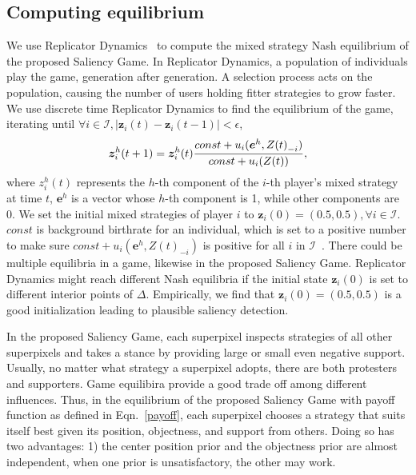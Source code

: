 \documentclass[journal]{IEEEtran}
\begin{document}
\subsection{Computing equilibrium}
We use Replicator Dynamics~\cite{Taylor1978Evolutionarily} to compute the mixed strategy Nash equilibrium of the proposed Saliency Game. In Replicator Dynamics, a population of individuals play the game, generation after generation. A selection process acts on the population, causing the number of users holding fitter strategies to grow faster. We use discrete time Replicator Dynamics to find the equilibrium of the game, iterating until $\forall i \in \mathcal{I}, \left |\boldsymbol{z}_i(t) - \boldsymbol{z}_i(t-1)\right| < \epsilon$,
\begin{equation}
\setlength{\abovedisplayskip}{2pt}
\setlength{\belowdisplayskip}{2pt}
\boldsymbol{z}_{i}^h(t+1) = \boldsymbol{z}_{i}^h(t) \frac{const + u_i(\boldsymbol{e}^h, {Z(t)}_{-i})}{const + u_i(Z(t))}, 
\end{equation}
where $z_{i}^h(t)$ represents the $h$-th component of the $i$-th player's mixed strategy at time $t$, $\boldsymbol{e}^h$ is a vector whose $h$-th component is 1, while other components are 0. We set the initial mixed strategies of player $i$ to $\boldsymbol{z}_i(0) = (0.5, 0.5), \forall i \in \mathcal{I}$. $const$ is background birthrate for an individual, which is set to a positive number to make sure $const + u_i(\boldsymbol{e}^h, {Z(t)}_{-i})$ is positive for all $i$ in $\mathcal{I}$~\cite{Weibull1999Eolutionary}. There could be multiple equilibria in a game, likewise in the proposed Saliency Game. Replicator Dynamics might reach different Nash equilibria if the initial state $\boldsymbol{z}_i(0)$ is set to different interior points of $\Delta$. Empirically, we find that $\boldsymbol{z}_i(0)=(0.5, 0.5)$ is a good initialization leading to plausible saliency detection. %

In the proposed Saliency Game, each superpixel inspects strategies of all other superpixels and takes a stance by providing large or small even negative support. Usually, no matter what strategy a superpixel adopts, there are both protesters and supporters. Game equilibira provide a good trade off among different influences. Thus, in the equilibrium of the proposed Saliency Game with payoff function as defined in Eqn.~\ref{payoff}, each superpixel chooses a strategy that suits itself best given its position, objectness, and support from others. Doing so has two advantages: 1) the center position prior and the objectness prior are almost independent, when one prior is unsatisfactory, the other may work.
\end{document}
